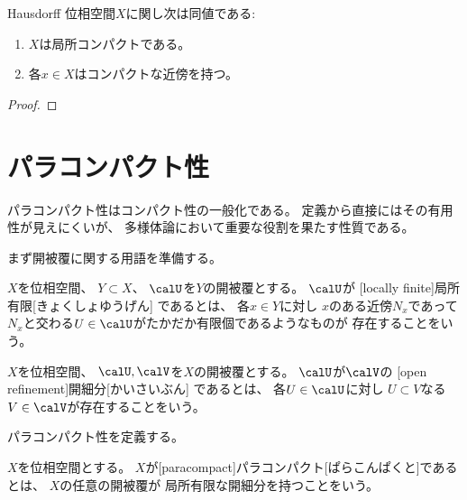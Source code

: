 \documentclass[report]{jlreq}
\begin{document}
\begin{proposition}
    Hausdorff 位相空間$X$に関し次は同値である:
    \begin{enumerate}
        \item $X$は局所コンパクトである。
        \item 各$x \in X$はコンパクトな近傍を持つ。
    \end{enumerate}
\end{proposition}

\begin{proof}
    \TODO{}
\end{proof}

%
\section{パラコンパクト性}

パラコンパクト性はコンパクト性の一般化である。
定義から直接にはその有用性が見えにくいが、
多様体論において重要な役割を果たす性質である。

まず開被覆に関する用語を準備する。

\begin{definition}[局所有限]
    $X$を位相空間、
    $Y \subset X$、
    $\calU$を$Y$の開被覆とする。
    $\calU$が
    [locally finite]{局所有限}[きょくしょゆうげん]
    であるとは、
    各$x \in Y$に対し
    $x$のある近傍$N_x$であって
    $N_x$と交わる$U \in \calU$がたかだか有限個であるようなものが
    存在することをいう。
\end{definition}

\begin{definition}[開細分]
    $X$を位相空間、
    $\calU, \calV$を$X$の開被覆とする。
    $\calU$が$\calV$の
    [open refinement]{開細分}[かいさいぶん]
    であるとは、
    各$U \in \calU$に対し
    $U \subset V$なる$V \in \calV$が存在することをいう。
\end{definition}

パラコンパクト性を定義する。

\begin{definition}[パラコンパクト]
    $X$を位相空間とする。
    $X$が[paracompact]{パラコンパクト}[ぱらこんぱくと]であるとは、
    $X$の任意の開被覆が
    局所有限な開細分を持つことをいう。
\end{definition}
\end{document}

